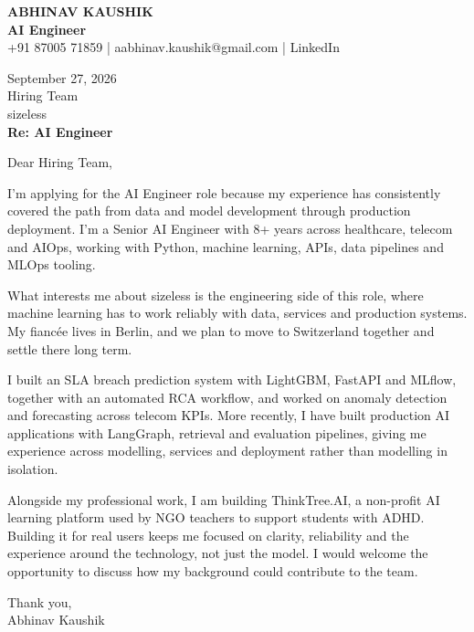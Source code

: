 \documentclass[10pt,a4paper]{article}
\begin{document}
\begin{center}
{\Large\bfseries ABHINAV KAUSHIK}\\[2pt]
{\bfseries AI Engineer}\\[2pt]
+91 87005 71859 \quad | \quad aabhinav.kaushik@gmail.com \quad | \quad LinkedIn
\end{center}
\vspace{8pt}
September 27, 2026\\[6pt]
Hiring Team\\
sizeless\\[4pt]
\textbf{Re: AI Engineer}

Dear Hiring Team,

I’m applying for the AI Engineer role because my experience has consistently covered the path from data and model development through production deployment. I’m a Senior AI Engineer with 8+ years across healthcare, telecom and AIOps, working with Python, machine learning, APIs, data pipelines and MLOps tooling.

What interests me about sizeless is the engineering side of this role, where machine learning has to work reliably with data, services and production systems. My fiancée lives in Berlin, and we plan to move to Switzerland together and settle there long term.

I built an SLA breach prediction system with LightGBM, FastAPI and MLflow, together with an automated RCA workflow, and worked on anomaly detection and forecasting across telecom KPIs. More recently, I have built production AI applications with LangGraph, retrieval and evaluation pipelines, giving me experience across modelling, services and deployment rather than modelling in isolation.

Alongside my professional work, I am building ThinkTree.AI, a non-profit AI learning platform used by NGO teachers to support students with ADHD. Building it for real users keeps me focused on clarity, reliability and the experience around the technology, not just the model. I would welcome the opportunity to discuss how my background could contribute to the team.

Thank you,\\
Abhinav Kaushik
\end{document}
